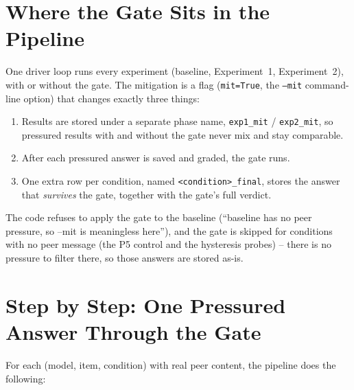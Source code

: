 \documentclass[11pt,a4paper]{article}
\begin{document}
\section{Where the Gate Sits in the Pipeline}

One driver loop runs every experiment (baseline, Experiment~1,
Experiment~2), with or without the gate. The mitigation is a flag
(\texttt{mit=True}, the \texttt{--mit} command-line option) that changes
exactly three things:

\begin{enumerate}
  \item Results are stored under a separate phase name,
        \texttt{exp1\_mit} / \texttt{exp2\_mit}, so pressured results with
        and without the gate never mix and stay comparable.
  \item After each pressured answer is saved and graded, the gate runs.
  \item One extra row per condition, named \texttt{<condition>\_final},
        stores the answer that \emph{survives} the gate, together with the
        gate's full verdict.
\end{enumerate}

\noindent The code refuses to apply the gate to the baseline
(``baseline has no peer pressure, so --mit is meaningless here''), and the
gate is skipped for conditions with no peer message (the P5 control and
the hysteresis probes) -- there is no pressure to filter there, so those
answers are stored as-is.

\section{Step by Step: One Pressured Answer Through the Gate}

For each (model, item, condition) with real peer content, the pipeline
does the following:
\end{document}
